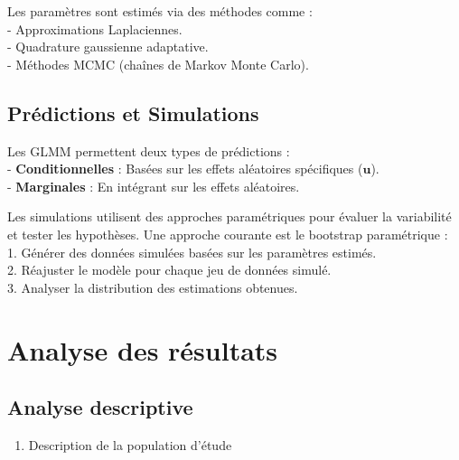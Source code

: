 \documentclass[
]{article}
\providecommand{\tightlist}{%
  \setlength{\itemsep}{0pt}\setlength{\parskip}{0pt}}
\begin{document}
Les paramètres sont estimés via des méthodes comme :\\
- Approximations Laplaciennes.\\
- Quadrature gaussienne adaptative.\\
- Méthodes MCMC (chaînes de Markov Monte Carlo).

\subsection{Prédictions et
Simulations}\label{pruxe9dictions-et-simulations}

Les GLMM permettent deux types de prédictions :\\
- \textbf{Conditionnelles} : Basées sur les effets aléatoires
spécifiques (\(\mathbf{u}\)).\\
- \textbf{Marginales} : En intégrant sur les effets aléatoires.

Les simulations utilisent des approches paramétriques pour évaluer la
variabilité et tester les hypothèses. Une approche courante est le
bootstrap paramétrique :\\
1. Générer des données simulées basées sur les paramètres estimés.\\
2. Réajuster le modèle pour chaque jeu de données simulé.\\
3. Analyser la distribution des estimations obtenues.

\section{Analyse des résultats}\label{analyse-des-ruxe9sultats}

\subsection{Analyse descriptive}\label{analyse-descriptive}

\begin{enumerate}
\def\labelenumi{\arabic{enumi}.}
\tightlist
\item
  Description de la population d'étude
\end{enumerate}
\end{document}
